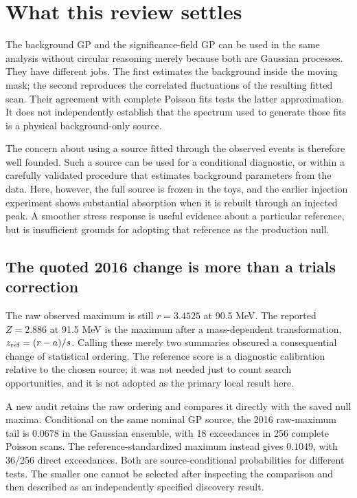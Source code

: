 \section{What this review settles}
The background GP and the significance-field GP can be used in the same analysis without circular reasoning merely because both are Gaussian processes. They have different jobs. The first estimates the background inside the moving mask; the second reproduces the correlated fluctuations of the resulting fitted scan. Their agreement with complete Poisson fits tests the latter approximation. It does not independently establish that the spectrum used to generate those fits is a physical background-only source.

The concern about using a source fitted through the observed events is therefore well founded. Such a source can be used for a conditional diagnostic, or within a carefully validated procedure that estimates background parameters from the data. Here, however, the full source is frozen in the toys, and the earlier injection experiment shows substantial absorption when it is rebuilt through an injected peak. A smoother stress response is useful evidence about a particular reference, but is insufficient grounds for adopting that reference as the production null.

\subsection{The quoted 2016 change is more than a trials correction}
The raw observed maximum is still $r=3.4525$ at 90.5 MeV. The reported $Z=2.886$ at 91.5 MeV is the maximum after a mass-dependent transformation, $z_{\rm ref}=(r-a)/s$. Calling these merely two summaries obscured a consequential change of statistical ordering. The reference score is a diagnostic calibration relative to the chosen source; it was not needed just to count search opportunities, and it is not adopted as the primary local result here.

A new audit retains the raw ordering and compares it directly with the saved null maxima. Conditional on the same nominal GP source, the 2016 raw-maximum tail is $0.0678$ in the Gaussian ensemble, with 18 exceedances in 256 complete Poisson scans. The reference-standardized maximum instead gives $0.1049$, with 36/256 direct exceedances. Both are source-conditional probabilities for different tests. The smaller one cannot be selected after inspecting the comparison and then described as an independently specified discovery result.

